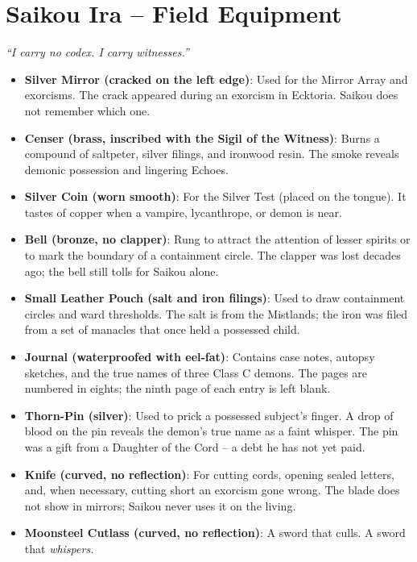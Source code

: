 \section*{Saikou Ira -- Field Equipment}

\noindent\textit{``I carry no codex. I carry witnesses.''}

\begin{itemize}[leftmargin=*]
  \item \textbf{Silver Mirror (cracked on the left edge)}: Used for the Mirror Array and exorcisms. The crack appeared during an exorcism in Ecktoria. Saikou does not remember which one.
  \item \textbf{Censer (brass, inscribed with the Sigil of the Witness)}: Burns a compound of saltpeter, silver filings, and ironwood resin. The smoke reveals demonic possession and lingering Echoes.
  \item \textbf{Silver Coin (worn smooth)}: For the Silver Test (placed on the tongue). It tastes of copper when a vampire, lycanthrope, or demon is near.
  \item \textbf{Bell (bronze, no clapper)}: Rung to attract the attention of lesser spirits or to mark the boundary of a containment circle. The clapper was lost decades ago; the bell still tolls for Saikou alone.
  \item \textbf{Small Leather Pouch (salt and iron filings)}: Used to draw containment circles and ward thresholds. The salt is from the Mistlands; the iron was filed from a set of manacles that once held a possessed child.
  \item \textbf{Journal (waterproofed with eel-fat)}: Contains case notes, autopsy sketches, and the true names of three Class C demons. The pages are numbered in eights; the ninth page of each entry is left blank.
  \item \textbf{Thorn-Pin (silver)}: Used to prick a possessed subject's finger. A drop of blood on the pin reveals the demon's true name as a faint whisper. The pin was a gift from a Daughter of the Cord -- a debt he has not yet paid.
  \item \textbf{Knife (curved, no reflection)}: For cutting cords, opening sealed letters, and, when necessary, cutting short an exorcism gone wrong. The blade does not show in mirrors; Saikou never uses it on the living.
  \item \textbf{Moonsteel Cutlass (curved, no reflection)}: A sword that culls. A sword that \textit{whispers.}
\end{itemize}

